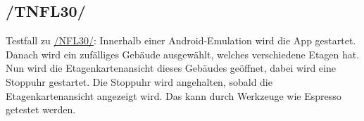 \subsection*{/TNFL30/}

\label{/TNFL30/} Testfall zu \hyperref[/NFL30/]{/NFL30/}: Innerhalb einer \Gls{Android}-\Gls{Emulation} wird die App gestartet.
Danach wird ein zufälliges Gebäude ausgewählt, welches verschiedene Etagen hat.
Nun wird die \Gls{Etagenkartenansicht} dieses Gebäudes geöffnet, dabei wird eine Stoppuhr gestartet.
Die Stoppuhr wird angehalten, sobald die \Gls{Etagenkartenansicht} angezeigt wird.
Das kann durch Werkzeuge wie \Gls{Espresso} getestet werden.